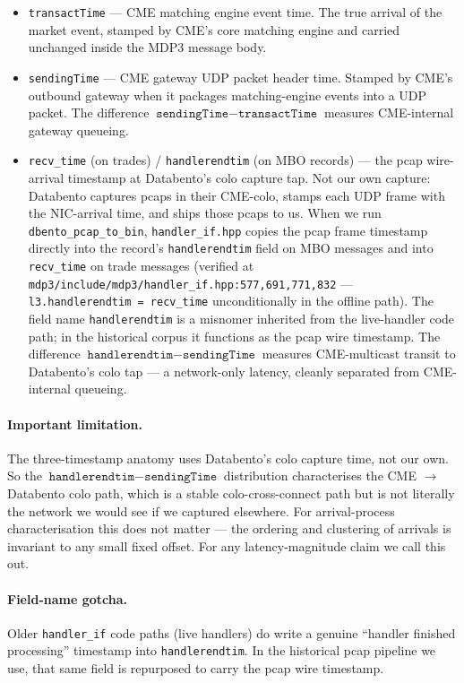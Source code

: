 \begin{itemize}
    \item \texttt{transactTime} --- CME matching engine event time. The true arrival of the market event, stamped by CME's core matching engine and carried unchanged inside the MDP3 message body.
    \item \texttt{sendingTime} --- CME gateway UDP packet header time. Stamped by CME's outbound gateway when it packages matching-engine events into a UDP packet. The difference $\texttt{sendingTime} - \texttt{transactTime}$ measures CME-internal gateway queueing.
    \item \texttt{recv\_time} (on trades) / \texttt{handlerendtim} (on MBO records) --- the pcap wire-arrival timestamp at Databento's colo capture tap. Not our own capture: Databento captures pcaps in their CME-colo, stamps each UDP frame with the NIC-arrival time, and ships those pcaps to us. When we run \texttt{dbento\_pcap\_to\_bin}, \texttt{handler\_if.hpp} copies the pcap frame timestamp directly into the record's \texttt{handlerendtim} field on MBO messages and into \texttt{recv\_time} on trade messages (verified at \texttt{mdp3/include/mdp3/handler\_if.hpp:577,691,771,832} --- \texttt{l3.handlerendtim = recv\_time} unconditionally in the offline path). The field name \texttt{handlerendtim} is a misnomer inherited from the live-handler code path; in the historical corpus it functions as the pcap wire timestamp. The difference $\texttt{handlerendtim} - \texttt{sendingTime}$ measures CME-multicast transit to Databento's colo tap --- a network-only latency, cleanly separated from CME-internal queueing.
\end{itemize}

\paragraph{Important limitation.} The three-timestamp anatomy uses Databento's colo capture time, not our own. So the $\texttt{handlerendtim} - \texttt{sendingTime}$ distribution characterises the CME $\to$ Databento colo path, which is a stable colo-cross-connect path but is not literally the network we would see if we captured elsewhere. For arrival-process characterisation this does not matter --- the ordering and clustering of arrivals is invariant to any small fixed offset. For any latency-magnitude claim we call this out.

\paragraph{Field-name gotcha.} Older \texttt{handler\_if} code paths (live handlers) do write a genuine ``handler finished processing'' timestamp into \texttt{handlerendtim}. In the historical pcap pipeline we use, that same field is repurposed to carry the pcap wire timestamp.

